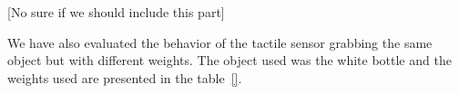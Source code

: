 [No sure if we should include this part]

We have also evaluated the behavior of the tactile sensor grabbing
the same object but with different weights. The object used was
the white bottle and the weights used are presented in the
table~\ref{}.






